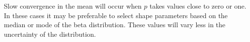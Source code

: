\documentclass[review]{elsarticle}
\begin{document}
Slow convergence in the mean will occur when $p$ takes values close to 
zero or one. In these cases it may be preferable to select shape parameters
based on the median or mode of the beta distribution. These values
will vary less in the uncertainty of the distribution.

%



\end{document}
